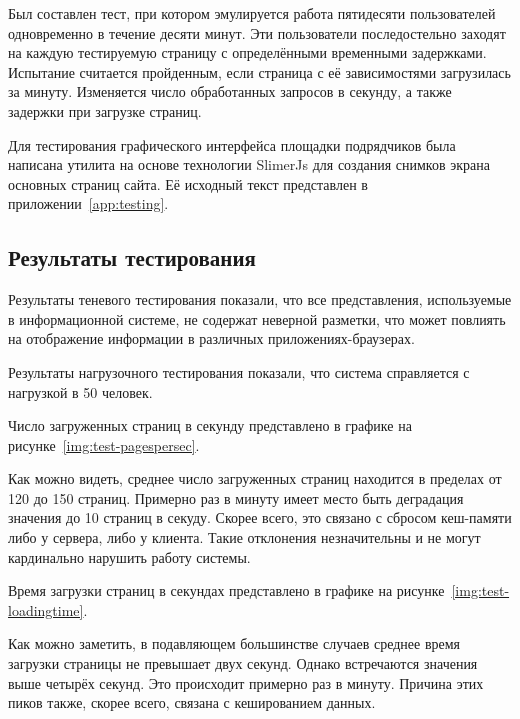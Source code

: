 Был составлен тест, при котором эмулируется работа пятидесяти пользователей одновременно в течение десяти минут.
Эти пользователи последостельно заходят на каждую тестируемую страницу с определёнными временными задержками.
Испытание считается пройденным, если страница с её зависимостями загрузилась за минуту.
Изменяется число обработанных запросов в секунду, а также задержки при загрузке страниц.

Для тестирования графического интерфейса площадки подрядчиков была написана утилита на основе технологии SlimerJs для создания снимков экрана основных страниц сайта.
Её исходный текст представлен в приложении~\ref{app:testing}.

\subsection{Результаты тестирования}

Результаты теневого тестирования показали, что все представления, используемые в информационной системе, не содержат неверной разметки, что может повлиять на отображение информации в различных приложениях-браузерах.

Результаты нагрузочного тестирования показали, что система справляется с нагрузкой в 50 человек.

Число загруженных страниц в секунду представлено в графике на рисунке~\ref{img:test-pagespersec}.


Как можно видеть, среднее число загруженных страниц находится в пределах от 120 до 150 страниц.
Примерно раз в минуту имеет место быть деградация значения до 10 страниц в секуду.
Скорее всего, это связано с сбросом кеш-памяти либо у сервера, либо у клиента.
Такие отклонения незначительны и не могут кардинально нарушить работу системы.

Время загрузки страниц в секундах представлено в графике на рисунке~\ref{img:test-loadingtime}.


Как можно заметить, в подавляющем большинстве случаев среднее время загрузки страницы не превышает двух секунд.
Однако встречаются значения выше четырёх секунд.
Это происходит примерно раз в минуту.
Причина этих пиков также, скорее всего, связана с кешированием данных.

